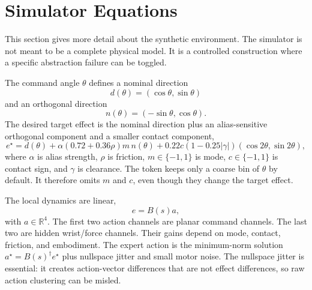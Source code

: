 \documentclass{article}
\begin{document}
\begin{table}[h]
\centering
\caption{Threshold sensitivity at alias strength $1.25$, averaged over 8 seeds.}
\label{tab:thresholdappendix}
\end{table}

\section{Simulator Equations}

This section gives more detail about the synthetic environment. The simulator
is not meant to be a complete physical model. It is a controlled construction
where a specific abstraction failure can be toggled.

The command angle $\theta$ defines a nominal direction
\[
    d(\theta)=(\cos\theta,\sin\theta)
\]
and an orthogonal direction
\[
    n(\theta)=(-\sin\theta,\cos\theta).
\]
The desired target effect is the nominal direction plus an alias-sensitive
orthogonal component and a smaller contact component,
\[
    e^\star
    =
    d(\theta)
    +
    \alpha(0.72+0.36\rho)m\,n(\theta)
    +
    0.22 c(1-0.25|\gamma|)
    (\cos 2\theta,\sin 2\theta),
\]
where $\alpha$ is alias strength, $\rho$ is friction, $m\in\{-1,1\}$ is mode,
$c\in\{-1,1\}$ is contact sign, and $\gamma$ is clearance. The token keeps only
a coarse bin of $\theta$ by default. It therefore omits $m$ and $c$, even though
they change the target effect.

The local dynamics are linear,
\[
    e=B(s)a,
\]
with $a\in\mathbb{R}^4$. The first two action channels are planar command
channels. The last two are hidden wrist/force channels. Their gains depend on
mode, contact, friction, and embodiment. The expert action is the
minimum-norm solution $a^\star=B(s)^\dagger e^\star$ plus nullspace jitter and
small motor noise. The nullspace jitter is essential: it creates action-vector
differences that are not effect differences, so raw action clustering can be
misled.
\end{document}
